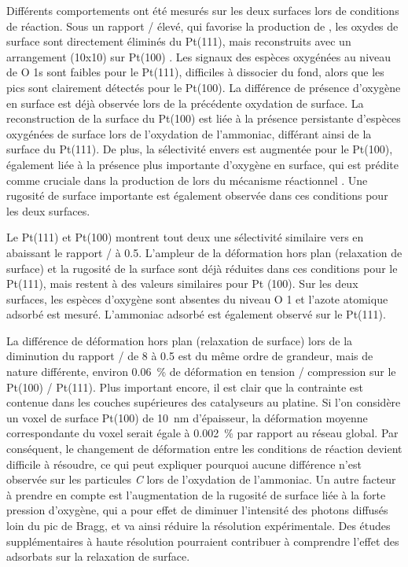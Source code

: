 Différents comportements ont été mesurés sur les deux surfaces lors de conditions de réaction.
Sous un rapport / élevé, qui favorise la production de , les oxydes de surface sont directement éliminés du Pt(111), mais reconstruits avec un arrangement (10x10) sur Pt(100) .
Les signaux des espèces oxygénées au niveau de O 1s sont faibles pour le Pt(111), difficiles à dissocier du fond, alors que les pics sont clairement détectés pour le Pt(100).
La différence de présence d’oxygène en surface est déjà observée lors de la précédente oxydation de surface.
La reconstruction de la surface du Pt(100) est liée à la présence persistante d'espèces oxygénées de surface lors de l'oxydation de l'ammoniac, différant ainsi de la surface du Pt(111).
De plus, la sélectivité envers  est augmentée pour le Pt(100), également liée à la présence plus importante d'oxygène en surface, qui est prédite comme cruciale dans la production de  lors du mécanisme réactionnel \parencite{NovellLeruth2005, Offermans2006, Offermans2007, Imbihl2007, NovellLeruth2008}.
Une rugosité de surface importante est également observée dans ces conditions pour les deux surfaces.

Le Pt(111) et Pt(100) montrent tout deux une sélectivité similaire vers  en abaissant le rapport / à \num{0,5}.
L'ampleur de la déformation hors plan (relaxation de surface) et la rugosité de la surface sont déjà réduites dans ces conditions pour le Pt(111), mais restent à des valeurs similaires pour Pt (100).
Sur les deux surfaces, les espèces d'oxygène sont absentes du niveau O 1 et l'azote atomique adsorbé est mesuré.
L'ammoniac adsorbé est également observé sur le Pt(111).

La différence de déformation hors plan (relaxation de surface) lors de la diminution du rapport / de \num{8} à \num{0,5} est du même ordre de grandeur, mais de nature différente, environ \qty{0,06}{\percent} de déformation en tension / compression sur le Pt(100) / Pt(111).
Plus important encore, il est clair que la contrainte est contenue dans les couches supérieures des catalyseurs au platine.
Si l'on considère un voxel de surface Pt(100) de \qty{10}{\nm} d'épaisseur, la déformation moyenne correspondante du voxel serait égale à \qty{0,002}{\percent} par rapport au réseau global.
Par conséquent, le changement de déformation entre les conditions de réaction devient difficile à résoudre, ce qui peut expliquer pourquoi aucune différence n'est observée sur les particules \textit{C} lors de l'oxydation de l'ammoniac.
Un autre facteur à prendre en compte est l'augmentation de la rugosité de surface liée à la forte pression d'oxygène, qui a pour effet de diminuer l'intensité des photons diffusés loin du pic de Bragg, et va ainsi réduire la résolution expérimentale.
Des études supplémentaires à haute résolution pourraient contribuer à comprendre l’effet des adsorbats sur la relaxation de surface.


